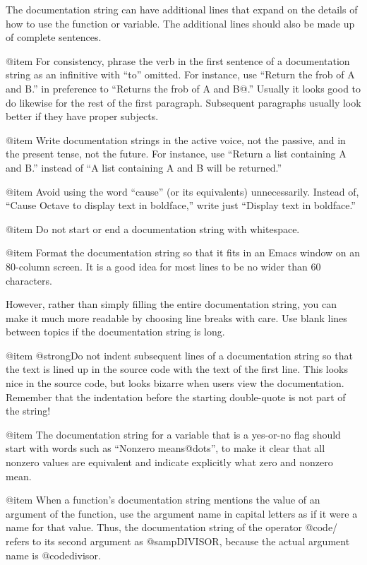 The documentation string can have additional lines that expand on the
details of how to use the function or variable.  The additional lines
should also be made up of complete sentences.

@item
For consistency, phrase the verb in the first sentence of a
documentation string as an infinitive with ``to'' omitted.  For
instance, use ``Return the frob of A and B.'' in preference to ``Returns
the frob of A and B@.''  Usually it looks good to do likewise for the
rest of the first paragraph.  Subsequent paragraphs usually look better
if they have proper subjects.

@item
Write documentation strings in the active voice, not the passive, and in
the present tense, not the future.  For instance, use ``Return a list
containing A and B.'' instead of ``A list containing A and B will be
returned.''

@item
Avoid using the word ``cause'' (or its equivalents) unnecessarily.
Instead of, ``Cause Octave to display text in boldface,'' write just
``Display text in boldface.''

@item
Do not start or end a documentation string with whitespace.

@item
Format the documentation string so that it fits in an Emacs window on an
80-column screen.  It is a good idea for most lines to be no wider than
60 characters.

However, rather than simply filling the entire documentation string, you
can make it much more readable by choosing line breaks with care.
Use blank lines between topics if the documentation string is long.
 
@item
@strong{Do not} indent subsequent lines of a documentation string so
that the text is lined up in the source code with the text of the first
line.  This looks nice in the source code, but looks bizarre when users
view the documentation.  Remember that the indentation before the
starting double-quote is not part of the string!

@item
The documentation string for a variable that is a yes-or-no flag should
start with words such as ``Nonzero means@dots{}'', to make it clear that
all nonzero values are equivalent and indicate explicitly what zero and
nonzero mean.

@item
When a function's documentation string mentions the value of an argument
of the function, use the argument name in capital letters as if it were
a name for that value.  Thus, the documentation string of the operator
@code{/} refers to its second argument as @samp{DIVISOR}, because the
actual argument name is @code{divisor}.


